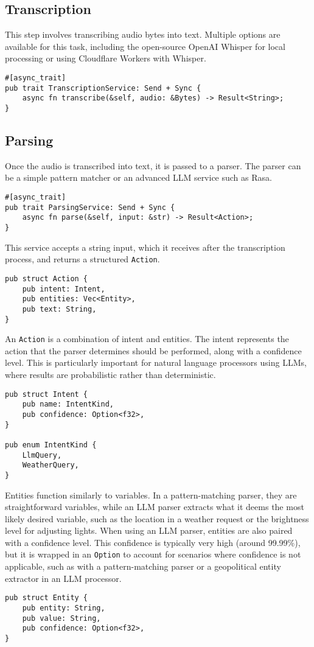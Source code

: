 \subsection{Transcription}
This step involves transcribing audio bytes into text. Multiple options are available for this task,
including the open-source OpenAI Whisper for local processing or using Cloudflare Workers with Whisper.

\begin{verbatim}
#[async_trait]
pub trait TranscriptionService: Send + Sync {
    async fn transcribe(&self, audio: &Bytes) -> Result<String>;
}
\end{verbatim}

\subsection{Parsing}
Once the audio is transcribed into text, it is passed to a parser.
The parser can be a simple pattern matcher or an advanced LLM service such as Rasa.

\begin{verbatim}
#[async_trait]
pub trait ParsingService: Send + Sync {
    async fn parse(&self, input: &str) -> Result<Action>;
}
\end{verbatim}

This service accepts a string input, which it receives after the transcription process, and returns a structured \texttt{Action}.

\begin{verbatim}
pub struct Action {
    pub intent: Intent,
    pub entities: Vec<Entity>,
    pub text: String,
}
\end{verbatim}

An \texttt{Action} is a combination of intent and entities.
The intent represents the action that the parser determines should be performed, along with a confidence level.
This is particularly important for natural language processors using LLMs, where results are probabilistic rather than deterministic.

\begin{verbatim}
pub struct Intent {
    pub name: IntentKind,
    pub confidence: Option<f32>,
}

pub enum IntentKind {
    LlmQuery,
    WeatherQuery,
}
\end{verbatim}

Entities function similarly to variables. In a pattern-matching parser, they are straightforward variables,
while an LLM parser extracts what it deems the most likely desired variable,
such as the location in a weather request or the brightness level for adjusting lights.
When using an LLM parser, entities are also paired with a confidence level.
This confidence is typically very high (around 99.99\%), but it is wrapped in an \texttt{Option}
to account for scenarios where confidence is not applicable,
such as with a pattern-matching parser or a geopolitical entity extractor in an LLM processor.

\begin{verbatim}
pub struct Entity {
    pub entity: String,
    pub value: String,
    pub confidence: Option<f32>,
}
\end{verbatim}
